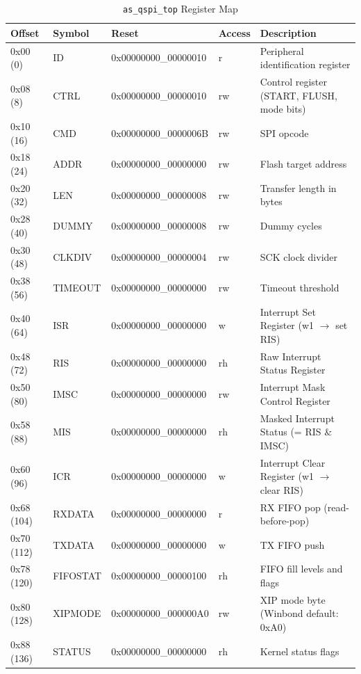 \begin{table}[H]
\caption{\texttt{as\_qspi\_top} Register Map}
\label{tab:asqspitop_regmap}
\centering
\begin{tabularx}{\textwidth}{|l|l| X| l| X|}
  \hline
  Offset & Symbol & Reset & Access & Description \\
  \hline\hline
  0x00 (0)   & ID        & \footnotesize{0x00000000\_00000010} & r   & Peripheral identification register \\
  \hline
  0x08 (8)   & CTRL      & \footnotesize{0x00000000\_00000010} & rw  & Control register (START, FLUSH, mode bits) \\
  \hline
  0x10 (16)  & CMD       & \footnotesize{0x00000000\_0000006B} & rw  & SPI opcode \\
  \hline
  0x18 (24)  & ADDR      & \footnotesize{0x00000000\_00000000} & rw  & Flash target address \\
  \hline
  0x20 (32)  & LEN       & \footnotesize{0x00000000\_00000008} & rw  & Transfer length in bytes \\
  \hline
  0x28 (40)  & DUMMY     & \footnotesize{0x00000000\_00000008} & rw  & Dummy cycles \\
  \hline
  0x30 (48)  & CLKDIV    & \footnotesize{0x00000000\_00000004} & rw  & SCK clock divider \\
  \hline
  0x38 (56)  & TIMEOUT   & \footnotesize{0x00000000\_00000000} & rw  & Timeout threshold \\
  \hline
  0x40 (64)  & ISR       & \footnotesize{0x00000000\_00000000} & w   & Interrupt Set Register (w1 $\to$ set RIS) \\
  \hline
  0x48 (72)  & RIS       & \footnotesize{0x00000000\_00000000} & rh  & Raw Interrupt Status Register \\
  \hline
  0x50 (80)  & IMSC      & \footnotesize{0x00000000\_00000000} & rw  & Interrupt Mask Control Register \\
  \hline
  0x58 (88)  & MIS       & \footnotesize{0x00000000\_00000000} & rh  & Masked Interrupt Status (= RIS \& IMSC) \\
  \hline
  0x60 (96)  & ICR       & \footnotesize{0x00000000\_00000000} & w   & Interrupt Clear Register (w1 $\to$ clear RIS) \\
  \hline
  0x68 (104) & RXDATA    & \footnotesize{0x00000000\_00000000} & r   & RX FIFO pop (read-before-pop) \\
  \hline
  0x70 (112) & TXDATA    & \footnotesize{0x00000000\_00000000} & w   & TX FIFO push \\
  \hline
  0x78 (120) & FIFOSTAT  & \footnotesize{0x00000000\_00000100} & rh  & FIFO fill levels and flags \\
  \hline
  0x80 (128) & XIPMODE   & \footnotesize{0x00000000\_000000A0} & rw  & XIP mode byte (Winbond default: 0xA0) \\
  \hline
  0x88 (136) & STATUS    & \footnotesize{0x00000000\_00000000} & rh  & Kernel status flags \\
  \hline
\end{tabularx}
\end{table}

